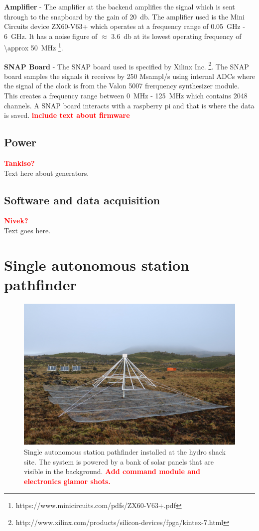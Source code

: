\documentclass{ws-jai}
\begin{document}
\textbf{Amplifier} - The amplifier at the backend amplifies the signal
which is sent through to the snapboard by the gain of
\SI{+20}{\decibel}. The amplifier used is the Mini Circuits device
ZX60-V63+ which operates at a frequency range of \SI{0.05}{GHz} -
\SI{6}{GHz}. It has a noise figure of $\approx$ \SI{3.6}{\decibel} at
its lowest operating frequency of \SI{\approx
  50}{MHz} \footnote{https://www.minicircuits.com/pdfs/ZX60-V63+.pdf}.

\textbf{SNAP Board} - The SNAP board used is specified by Xilinx
Inc. \footnote{http://www.xilinx.com/products/silicon-devices/fpga/kintex-7.html}. The
SNAP board samples the signals it receives by 250 Msampl/s using
internal ADCs where the signal of the clock is from the Valon 5007
frerquency synthesizer module. This creates a frequency range between
\SI{0}{MHz} - \SI{125}{MHz} which contains 2048 channels. A SNAP board
interacts with a raspberry pi and that is where the data is saved.
\textcolor{red}{\bf include text about firmware}

\subsection{Power}
\textcolor{red}{\bf Tankiso?} \\
Text here about generators.

\subsection{Software and data acquisition}
\textcolor{red}{\bf Nivek?} \\
Text goes here.

\section{Single autonomous station pathfinder}

\begin{figure}
  \begin{center}
    \includegraphics[width=0.7\linewidth]{Figures/autonomous.jpg}
    \caption{Single autonomous station pathfinder installed at the
      hydro shack site.  The system is powered by a bank of solar
      panels that are visible in the background.  \textcolor{red}{\bf
        Add command module and electronics glamor shots.}}
    \label{Fig:autonomous}
  \end{center}
\end{figure}
\end{document}
